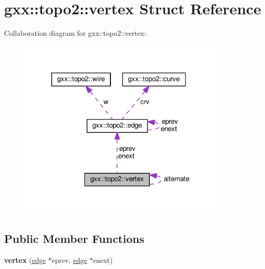 \hypertarget{structgxx_1_1topo2_1_1vertex}{}\section{gxx\+:\+:topo2\+:\+:vertex Struct Reference}
\label{structgxx_1_1topo2_1_1vertex}


Collaboration diagram for gxx\+:\+:topo2\+:\+:vertex\+:
\nopagebreak
\begin{figure}[H]
\begin{center}
\leavevmode
\includegraphics[width=283pt]{structgxx_1_1topo2_1_1vertex__coll__graph}
\end{center}
\end{figure}
\subsection*{Public Member Functions}
\begin{DoxyCompactItemize}
\item 
{\bfseries vertex} (\hyperlink{structgxx_1_1topo2_1_1edge}{edge} $\ast$eprev, \hyperlink{structgxx_1_1topo2_1_1edge}{edge} $\ast$enext)\hypertarget{structgxx_1_1topo2_1_1vertex_a6290d007528c87525d92b4b59a046a61}{}\label{structgxx_1_1topo2_1_1vertex_a6290d007528c87525d92b4b59a046a61}

\end{DoxyCompactItemize}
